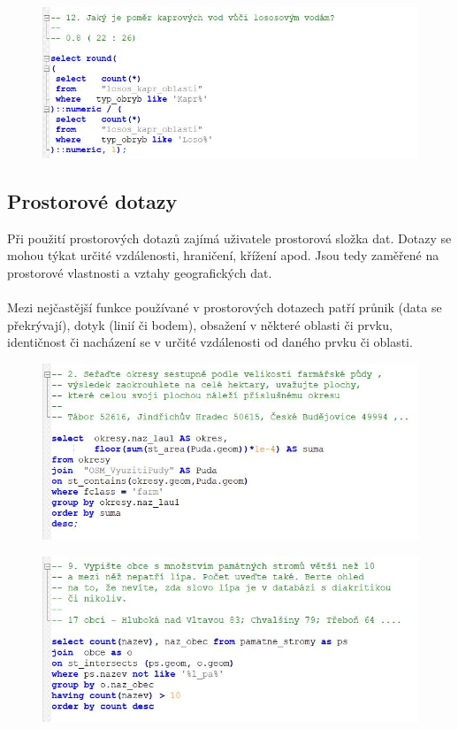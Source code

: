 \documentclass[a4paper, 12pt]{article}
\begin{document}
\begin{figure}[h!]
	\centering
	\includegraphics[width=15cm]{pictures/at3.jpg}
\end{figure}

\subsection{Prostorové dotazy}
Při použití prostorových dotazů zajímá uživatele prostorová složka dat. Dotazy se mohou týkat určité vzdálenosti, hraničení, křížení apod. Jsou tedy zaměřené na prostorové vlastnosti a vztahy geografických dat. \\
\\
Mezi nejčastější funkce používané v prostorových dotazech patří průnik (data se překrývají), dotyk (linií či bodem), obsažení v některé oblasti či prvku, identičnost či nacházení se v určité vzdálenosti od daného prvku či oblasti. 

\begin{figure}[h!]
	\centering
	\includegraphics[width=15cm]{pictures/pd1.jpg}
\end{figure}

\begin{figure}[h!]
	\centering
	\includegraphics[width=15cm]{pictures/pd3.jpg}
\end{figure}
\end{document}
